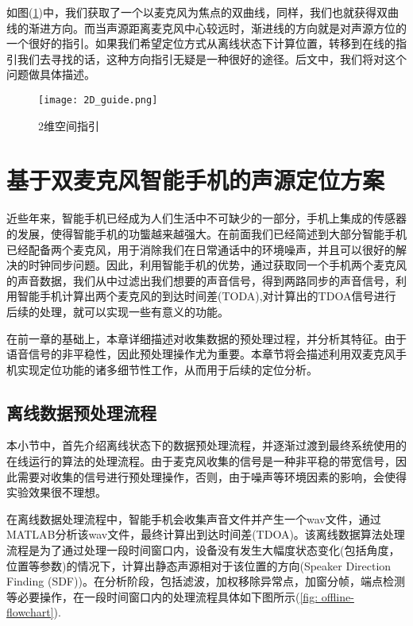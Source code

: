 \documentclass[winfonts]{njuthesis}
\begin{document}
		如图(\ref{fig: 2D_guide})中，我们获取了一个以麦克风为焦点的双曲线，同样，我们也就获得双曲线的渐进方向。而当声源距离麦克风中心较远时，渐进线的方向就是对声源方位的一个很好的指引。如果我们希望定位方式从离线状态下计算位置，转移到在线的指引我们去寻找的话，这种方向指引无疑是一种很好的途径。后文中，我们将对这个问题做具体描述。
		
		\begin{figure}[H]
			\centering
			\texttt{[image: 2D\_guide.png]} 
			\caption{2维空间指引}
			\label{fig: 2D_guide}
		\end{figure}
	
\chapter{基于双麦克风智能手机的声源定位方案}\label{chapter_work}
	
	近些年来，智能手机已经成为人们生活中不可缺少的一部分，手机上集成的传感器的发展，使得智能手机的功螚越来越强大。在前面我们已经简述到大部分智能手机已经配备两个麦克风，用于消除我们在日常通话中的环境噪声，并且可以很好的解决的时钟同步问题。因此，利用智能手机的优势，通过获取同一个手机两个麦克风的声音数据，我们从中过滤出我们想要的声音信号，得到两路同步的声音信号，利用智能手机计算出两个麦克风的到达时间差(TODA),对计算出的TDOA信号进行后续的处理，就可以实现一些有意义的功能。
	
	在前一章的基础上，本章详细描述对收集数据的预处理过程，并分析其特征。由于语音信号的非平稳性，因此预处理操作尤为重要。本章节将会描述利用双麦克风手机实现定位功能的诸多细节性工作，从而用于后续的定位分析。
	
	\section{离线数据预处理流程}
	
		本小节中，首先介绍离线状态下的数据预处理流程，并逐渐过渡到最终系统使用的在线运行的算法的处理流程。由于麦克风收集的信号是一种非平稳的带宽信号，因此需要对收集的信号进行预处理操作，否则，由于噪声等环境因素的影响，会使得实验效果很不理想。
		
		在离线数据处理流程中，智能手机会收集声音文件并产生一个wav文件，通过MATLAB分析该wav文件，最终计算出到达时间差(TDOA)。该离线数据算法处理流程是为了通过处理一段时间窗口内，设备没有发生大幅度状态变化(包括角度，位置等参数)的情况下，计算出静态声源相对于该位置的方向(Speaker Direction Finding (SDF))。在分析阶段，包括滤波，加权移除异常点，加窗分帧，端点检测等必要操作，在一段时间窗口内的处理流程具体如下图所示(\ref{fig: offline-flowchart}).
		
\end{document}
